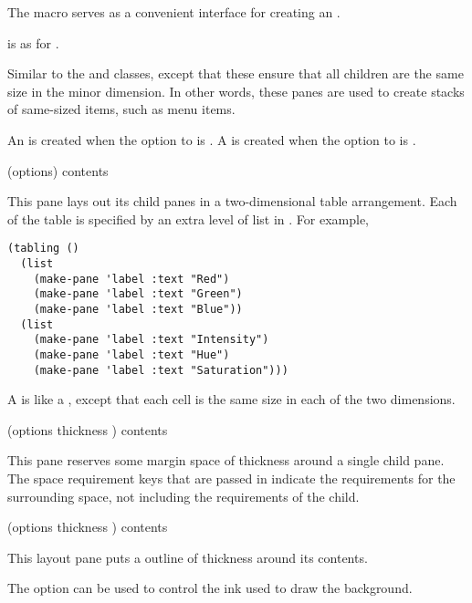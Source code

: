 The  macro serves as a convenient interface for creating an
.

 is as for .



Similar to the  and  classes, except that these
ensure that all children are the same size in the minor dimension.  In other
words, these panes are used to create stacks of same-sized items, such as menu
items.

An  is created when the  option to
 is .  A  is created when the
 option to  is .


 {(\rest options) \body contents}

This pane lays out its child panes in a two-dimensional table arrangement.  Each
of the table is specified by an extra level of list in .  For example,

\begin{verbatim}
(tabling ()
  (list
    (make-pane 'label :text "Red")
    (make-pane 'label :text "Green")
    (make-pane 'label :text "Blue"))
  (list
    (make-pane 'label :text "Intensity")
    (make-pane 'label :text "Hue")
    (make-pane 'label :text "Saturation")))
\end{verbatim}



A  is like a , except that each cell is the same
size in each of the two dimensions.


 {(\rest options \key thickness \allow) \body contents} 

This pane reserves some margin space of thickness  around a
single child pane.  The space requirement keys that are passed in indicate the
requirements for the surrounding space, not including the requirements of the
child.


 {(\rest options \key thickness \allow) \body contents} 

This layout pane puts a outline of thickness  around its contents.

The  option can be used to control the ink used to draw the
background.


